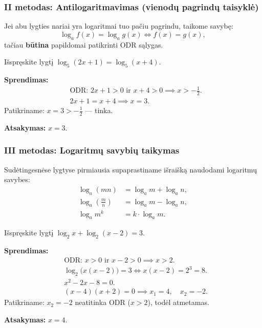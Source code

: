 \subsubsection{II metodas: Antilogaritmavimas (vienodų pagrindų taisyklė)}

Jei abu lygties nariai yra logaritmai tuo pačiu pagrindu, taikome savybę:
\[
\log_a f(x) = \log_a g(x) \iff f(x) = g(x),
\]
tačiau \textbf{būtina} papildomai patikrinti ODR sąlygas.

\begin{example}
Išspręskite lygtį \(\log_5(2x + 1) = \log_5(x + 4)\).

\textbf{Sprendimas:}
\begin{align*}
&\text{ODR: } 2x + 1 > 0 \text{ ir } x + 4 > 0 \implies x > -\tfrac{1}{2}.\\
&2x + 1 = x + 4 \implies x = 3.
\end{align*}
Patikriname: \(x = 3 > -\tfrac{1}{2}\) — tinka.

\textbf{Atsakymas:} \(x = 3\).
\end{example}

\subsubsection{III metodas: Logaritmų savybių taikymas}

Sudėtingesnėse lygtyse pirmiausia supaprastiname išraišką naudodami logaritmų savybes:
\begin{align*}
\log_a(mn) &= \log_a m + \log_a n,\\
\log_a\!\left(\frac{m}{n}\right) &= \log_a m - \log_a n,\\
\log_a m^k &= k \cdot \log_a m.
\end{align*}

\begin{example}
Išspręskite lygtį \(\log_2 x + \log_2(x - 2) = 3\).

\textbf{Sprendimas:}
\begin{align*}
&\text{ODR: } x > 0 \text{ ir } x - 2 > 0 \implies x > 2.\\
&\log_2\bigl(x(x-2)\bigr) = 3 \iff x(x-2) = 2^3 = 8.\\
&x^2 - 2x - 8 = 0.\\
&(x-4)(x+2) = 0 \implies x_1 = 4,\quad x_2 = -2.
\end{align*}
Patikriname: \(x_2 = -2\) neatitinka ODR (\(x > 2\)), todėl atmetamas.

\textbf{Atsakymas:} \(x = 4\).
\end{example}

